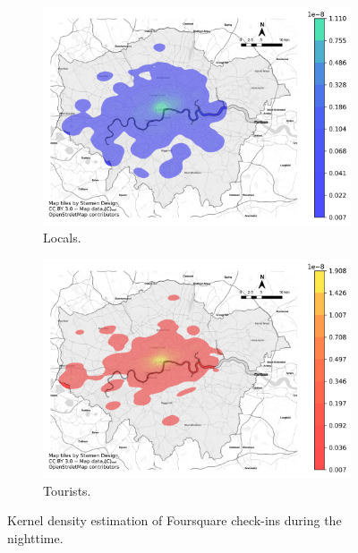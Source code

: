\documentclass{article}
\begin{document}
\begin{figure}[!h]

\begin{subfigure}{0.5\textwidth}
\includegraphics[width=1\linewidth]{figures/kde_locals_nighttime.png} 
\caption{Locals.}
\label{fig:kde_locals_nighttime}
\end{subfigure}
\begin{subfigure}{0.5\textwidth}
\includegraphics[width=1\linewidth]{figures/kde_tourists_nighttime.png}
\caption{Tourists.}
\label{fig:kde_tourists_nighttime}
\end{subfigure}

\caption{Kernel density estimation of Foursquare check-ins during the nighttime.} \label{fig:kde_nighttime}
\end{figure}
\end{document}
